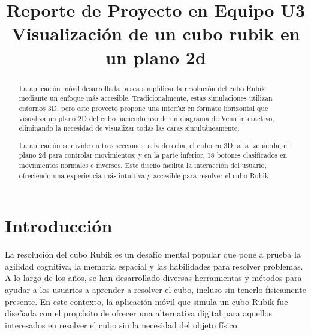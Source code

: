                                                                                                                                                                                                                                                                                                                                                                                                                                                                                                                                                                                                                                                                                                                                                                                                                                                                                                                                                                                                                                                                                                                                                                                                                                                                                                                                                                                                                                                                                                                                                                                                                                                                                                                                                                                                                                                                                                                                                                                                                                                                                                                                                                                                                                                                                                                                                                                                                                                                                                                                                                                                                                                                                                                                                                                                                                                                                                                                                                                                                                                                                                                                                                                                                                                                                                                                                                                                                                                                                                                                                                                                                                                                                                                                                                                                                                                                                                                                                                                                                                                                                                                                                                                                                                                                                                                                                                                                                                                                                                                                                                                                                                                                                                                                                                                                                                                                                                                                                                                                                                                                                                                                                                                                                                                                                                                                                                                                                                                                                                                                                                                                                                                                                                                                                                                                                                                                                                                                                                                                                                                                                                                                                                                                                                                                                                                                                                                                                                                                                                                                                                                                                                                                                                                                                                                                                                                                                                                                                                                                                                                                                                                                                                                                                                                                                                                                                                                                                                                                                                                                                                                                                                                                                                                                                                                                                                                                                                                                                                                                                                                                                                                                                                                                                                                                                                                                                                                                                                                                                                                                                                                                                                                                                                                                                                                                                                                                                                                                                                                                                                                                                                                                                                                                                                                                                                                                                                                                                                                                                                                                                                                                                                                                                                                                                                                                                                                                                                                                                                                                                                                                                                                                                                                                                                                                                                                                                                                                                                                                                                                                                                                                                                                                                                                                                                                                                                                                                                                                                                                                                                                                                                                                                                                                                                                                                                                                                                                                                                                                                                                                                                                                                                                                                                                                                                                                                                                                                                                                                                                                                                                                                                                                                                                                                                                                                                                                                                                                                                                                                                                                                                                                                                                                                                                                                                                                                                                                                                                                                                                                                                                                                                                                                                                                                                                                                                                                                                                                                                                                                                                                                                                                                                                                                                                                                                                                                                                                                                                                                                                                                                                                                                                                                                                                                                                                                                                                                                                                                                                                                                                                                                                                                                                                                                                                                                                                                                                                                                                                                                                                                                                                                                                                                                                                                                                                                                                                                                                                                                                                                                                                                                                                                                                                                                                                                                                                                                                                                                                                                                                                                                                                                                                                                                                                                                                                                                                                                                                                                                                                                                                                                                                                                                                                                                                                                                                                                                                                                                                                                                                                                                                                                                                                                                                                                                                                                                                                                                                                                                                                                                                                                                                                                                                                                                                                                                                                                                                                                                                                                                                                                                                                                                                                                                                                                                                                                                                                                                                                                                                                                                                                                                                                                                                                                                                                                                                                                                                                                                                                                                                                                                                                                                                                                                                                                                                                                                                                                                                                                                                                                                                                                                                                                                                                                                                                                                                                                                                                                                                                                                                                                                                                                                                                                                                                                                                                                                                                                                                                                                                                                                                                                                                                                                                                                                                                                                                                                                                                                                                                                                                                                                                                                                                                                                                                                                                                                                                                                                                                                                                                                                                                                                                                                                                                                                                                                                                                                                                                                                                                                                                                                                                                                                                                                                                                                                                                                                                                                                                                                                                                                                                                                                                                                                                                                                                                                                                                                                                                                                                                                                                                                                                                                                                                                                                                                                                                                                                                                                                                                                                                                                                                                                                                                                                                                                                                                                                                                                                                                                                                                                                                                                                                                                                                                                                                                                                                                                                                                                                                                                                                                                                                                                                                                                                                                                                                                                                                                                                                                                                                                                                                                                                                                                                                                                                                                                                                                                                                                                                                                                                                                                                                                                                                                                                                                                                                                                                                                                                                                                                                                                                                                                                                                                                                                                                                                                                                                                                                                                                                                                                                                                                                                                                                                                                                                                                                                                                                                                                                                                                                                                                                                                                                                                                                                                                                                                                                                                                                                                                                                                                                                                                                                                                                                                                                                                                                                                                                                                                                                                                                                                                                                                                                                                                                                                                                                                                                                                                                                                                                                                                                                                                                                                                                                                                                                                                                                                                                                                                                                                                                                                                                                                                                                                                                                                                                                                                                                                                                                                                                                                                                                                                                                                                                                                                                                                                                                                                                                                                                                                                                                                                                                                                                                                                                                                                                                                                                                                                                                                                                                                                                                                                                                                                                                                                                                                                                                                                                                                                                                                                                                                                                                                                                                                                                                                                                                                                                                                                                                                                                                                                                                                                                                                                                                                                                                                                                                                                                                                                                                                                                                                                                                                                                                                                                                                                                                                                                                                                                                                                                                                                                                                                                                                                                                                                                                                                                                                                                                                                                                                                                                                                                                                                                                                                                                                                                                                                                                                                                                                                                                                                                                                                                                                                                                                                                                                                                                                                                                                                                                                                                                                                                                                                                                                                                                                                                                                                                                                                                                                                                                                                                                                                                                                                                                                                                                                                                                                                                                                                                                                                                                                                                                                                                                                                                                                                                                                                                                                                                                                                                                                                                                                                                                                                                                                                                                                                                                                                                                                                                                                                                                                                                                                                                                                                                                                                                                                                                                                                                                                                                                                                                                                                                                                                                                                                                                                                                                                                                                                                                                                                                                                                                                                                                                                                                                                                                                                                                                                                                                                                                                                                                                                                                                                                                                                                                                                                                                                                                                                                                                                                                                                                                                                                                                                                                                                                                                                                                                                                                                                                                                                                                                                                                                                                                                                                                                                                                                                                                                                                                                                                                                                                                                                                                                                                                                                                                                                                                                                                                                                                                                                                                                                                                                                                                                                                                                                                                                                                                                                                                                                                                                                                                                                                                                                                                                                                                                                                                                                                                                                                                                                                                                                                                                                                                                                                                                                                                                                                                                                                                                                                                                                                                                                                                                                                                                                                                                                                                                                                                                                                                                                                                                                                                                                                                                                                                                                                                                                                                                                                                                                                                                                                                                                                                                                                                                                                                                                                                                                                                                                                                                                                                                                                                                                                                                                                                                                                                                                                                                                                                                                                                                                                                                                                                                                                                                                                                                                                                                                                                                                                                                                                                                                                                                                                                                                                                                                                                                                                                                                                                                                                                                                                                                                                                                                                                                                                                                                                                                                                                                                                                                                                                                                                                                                                                                                                                                                                                                                                                                                                                                                                                                                                                                                                                                                                                                                                                                                                                                                                                                                                                                                                                                                                                                                                                                                                                                                                                                                                                                                                                                                                                                                                                                                                                                                                                                                                                                                                                                                                                                                                                                                                                                                                                                                                                                                                                                                                                                                                                                                                                                                                                                                                \documentclass[conference]{IEEEtran}
\begin{document}
\title{Reporte de Proyecto en Equipo U3 \\ Visualización de un cubo rubik en un plano 2d}

\author{
}

\maketitle

\begin{abstract}
La aplicación móvil desarrollada busca simplificar la resolución del cubo Rubik mediante un enfoque más accesible. Tradicionalmente, estas simulaciones utilizan entornos 3D, pero este proyecto propone una interfaz en formato horizontal que visualiza un plano 2D del cubo haciendo uso de un diagrama de Venn interactivo, eliminando la necesidad de visualizar todas las caras simultáneamente.

La aplicación se divide en tres secciones: a la derecha, el cubo en 3D; a la izquierda, el plano 2d para controlar movimientos; y en la parte inferior, 18 botones clasificados en movimientos normales e inversos. Este diseño facilita la interacción del usuario, ofreciendo una experiencia más intuitiva y accesible para resolver el cubo Rubik.
\end{abstract}


\section{Introducción}
La resolución del cubo Rubik es un desafío mental popular que pone a prueba la agilidad cognitiva, la memoria espacial y las habilidades para resolver problemas.\cite{bellavista_cubo} A lo largo de los años, se han desarrollado diversas herramientas y métodos para ayudar a los usuarios a aprender a resolver el cubo, incluso sin tenerlo físicamente presente. En este contexto, la aplicación móvil que simula un cubo Rubik fue diseñada con el propósito de ofrecer una alternativa digital para aquellos interesados en resolver el cubo sin la necesidad del objeto físico.
\end{document}
